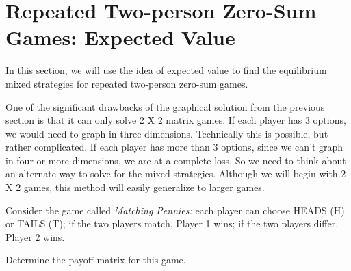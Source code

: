 
\section{Repeated Two-person Zero-Sum Games: Expected Value}



\vspace{.1in}
In this section, we will use the idea of expected value to find the equilibrium mixed strategies for repeated two-person zero-sum games. 

One of the significant drawbacks of the graphical solution from the previous section is that it can only solve 2 X 2 matrix games. If each player has 3 options, we would need to graph in three dimensions. Technically this is possible, but rather complicated. If each player has more than 3 options, since we can't graph in four or more dimensions, we are at a complete loss. So we need to think about an alternate way to solve for the mixed strategies. Although we will begin with 2 X 2 games, this method will easily generalize to larger games.



\begin{example}\label{G:matching pennies}Consider the game called \emph{Matching Pennies:} each player can choose HEADS (H) or TAILS (T); if the two players match, Player 1 wins; if the two players differ, Player 2 wins.
\end{example}

\begin{xca}\label{E:mpmatrix}
Determine the payoff matrix for this game. 
\end{xca}

